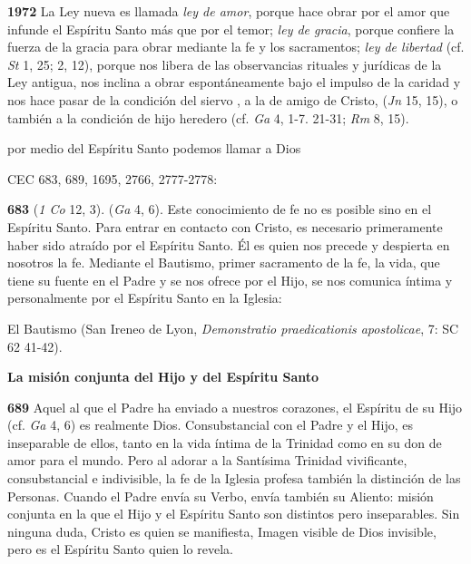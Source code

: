 \textbf{1972} La Ley nueva es llamada \emph{ley de amor}, porque hace obrar por el amor que infunde el Espíritu Santo más que por el temor; \emph{ley de gracia}, porque confiere la fuerza de la gracia para obrar mediante la fe y los sacramentos; \emph{ley de libertad} (cf. \emph{St} 1, 25; 2, 12), porque nos libera de las observancias rituales y jurídicas de la Ley antigua, nos inclina a obrar espontáneamente bajo el impulso de la caridad y nos hace pasar de la condición del siervo , a la de amigo de Cristo,  (\emph{Jn} 15, 15), o también a la condición de hijo heredero (cf. \emph{Ga} 4, 1-7. 21-31; \emph{Rm} 8, 15).

por medio del Espíritu Santo podemos llamar a Dios 

CEC 683, 689, 1695, 2766, 2777-2778:

\textbf{683}  (\emph{1 Co} 12, 3).  (\emph{Ga} 4, 6). Este conocimiento de fe no es posible sino en el Espíritu Santo. Para entrar en contacto con Cristo, es necesario primeramente haber sido atraído por el Espíritu Santo. Él es quien nos precede y despierta en nosotros la fe. Mediante el Bautismo, primer sacramento de la fe, la vida, que tiene su fuente en el Padre y se nos ofrece por el Hijo, se nos comunica íntima y personalmente por el Espíritu Santo en la Iglesia:

El Bautismo  (San Ireneo de Lyon, \emph{Demonstratio praedicationis apostolicae}, 7: SC 62 41-42).

\textbf{La misión conjunta del Hijo y del Espíritu Santo}

\textbf{689} Aquel al que el Padre ha enviado a nuestros corazones, el Espíritu de su Hijo (cf. \emph{Ga} 4, 6) es realmente Dios. Consubstancial con el Padre y el Hijo, es inseparable de ellos, tanto en la vida íntima de la Trinidad como en su don de amor para el mundo. Pero al adorar a la Santísima Trinidad vivificante, consubstancial e indivisible, la fe de la Iglesia profesa también la distinción de las Personas. Cuando el Padre envía su Verbo, envía también su Aliento: misión conjunta en la que el Hijo y el Espíritu Santo son distintos pero inseparables. Sin ninguna duda, Cristo es quien se manifiesta, Imagen visible de Dios invisible, pero es el Espíritu Santo quien lo revela.

